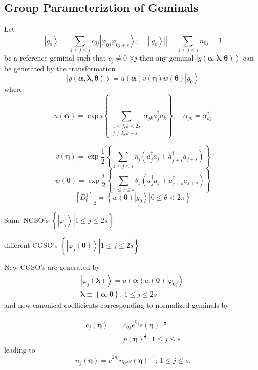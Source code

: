 \documentclass[aps,preprint]{revtex4}%
\begin{document}
\subsection{Group Parameteriztion of Geminals}

Let
\[
\left\vert g_{0}\right\rangle =\sum_{1\leq j\leq s}c_{0j}\left\vert
\varphi_{0j}\varphi_{0j+s}\right\rangle ;\quad\left\Vert \left\vert
g_{0}\right\rangle \right\Vert =\sum_{1\leq j\leq s}n_{0j}=1
\]
be a reference geminal such that $c_{j}\neq0$ $\forall j$ then any geminal
$\left\vert g\left(  \mathbf{\alpha},\mathbf{\lambda},\mathbf{\theta}\right)
\right\rangle $ can be generated by the transformation
\[
\left\vert g\left(  \mathbf{\alpha},\mathbf{\lambda},\mathbf{\theta}\right)
\right\rangle =u\left(  \mathbf{\alpha}\right)  v\left(  \mathbf{\eta}\right)
w\left(  \mathbf{\theta}\right)  \left\vert g_{0}\right\rangle
\]
where
\[
u\left(  \mathbf{\alpha}\right)  =\exp i\left\{  \sum_{\substack{1\leq
j,k\leq2s\\j\neq k,k\pm s}}\alpha_{jk}a_{j}^{\dagger}a_{k}\right\}
;\quad\alpha_{jk}=\alpha_{kj}^{\ast}%
\]
%

\[
v\left(  \mathbf{\eta}\right)  =\exp\frac{1}{2}\left\{  \sum_{1\leq j\leq
s}\eta_{j}\left(  a_{j}^{\dagger}a_{j}+a_{j+s}^{\dagger}a_{j+s}\right)
\right\}
\]%
\[
w\left(  \mathbf{\theta}\right)  =\exp\frac{i}{2}\left\{  \sum_{1\leq j\leq
s}\theta_{j}\left(  a_{j}^{\dagger}a_{j}+a_{j+s}^{\dagger}a_{j+s}\right)
\right\}
\]%
\[
\left[  D_{0}^{1}\right]  _{2}=\left\{  \left.  w\left(  \mathbf{\theta
}\right)  \left\vert g_{0}\right\rangle \right\vert 0\leq\theta<2\pi\right\}
\]


Same NGSO's $\left\{  \left.  \left\vert \varphi_{j}\right\rangle \right\vert
1\leq j\leq2s\right\}  $%
\[
\left.  {}\right.
\]


different CGSO's $\left\{  \left.  \left\vert \varphi_{j}\left(
\mathbf{\theta}\right)  \right\rangle \right\vert 1\leq j\leq2s\right\}  $

New CGSO's are generated by
\begin{align*}
&  \left\vert \varphi_{j}\left(  \mathbf{\lambda}\right)  \right\rangle
=u\left(  \mathbf{\alpha}\right)  w\left(  \mathbf{\theta}\right)  \left\vert
\varphi_{0j}\right\rangle \quad\\
&  \mathbf{\lambda\equiv}\left\{  \mathbf{\alpha,\theta}\right\}
\mathbf{,\,}1\leq j\leq2s
\end{align*}
and new canonical coefficients corresponding to normalized geminals by%

\begin{align*}
c_{j}\left(  \mathbf{\eta}\right)   &  =c_{0j}e^{\eta_{j}}\mathit{s}\left(
\mathbf{\eta}\right)  ^{-\frac{1}{2}}\\
&  =p\left(  \mathbf{\eta}\right)  ^{\frac{1}{2}};\mathbf{\,}1\leq j\leq s
\end{align*}
leading to
\[
n_{j}\left(  \mathbf{\eta}\right)  =e^{2\eta_{j}}n_{0j}\mathit{s}\left(
\mathbf{\eta}\right)  ^{-1};\mathbf{\,}1\leq j\leq s.
\]
\end{document}
